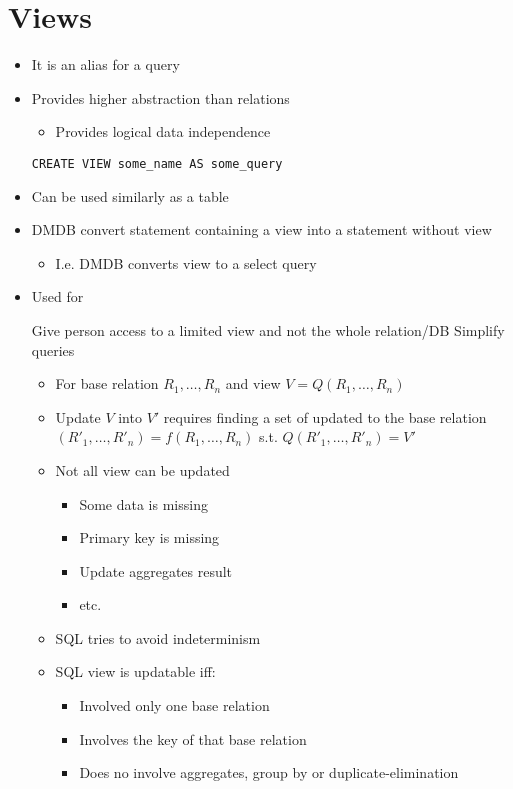 
\section{Views}
\begin{itemize}
    \item It is an alias for a query
    \item Provides higher abstraction than relations
        \begin{itemize}
            \item Provides logical data independence
        \end{itemize}
     \verb+CREATE VIEW some_name AS some_query+
    \item Can be used similarly as a table
    \item DMDB convert statement containing a view into a statement without view
        \begin{itemize}
            \item I.e. DMDB converts view to a select query
        \end{itemize}
    \item Used for
        \begin{itemize}
             Give person access to a limited view and not the whole relation/DB
             Simplify queries
        \end{itemize}
        \begin{itemize}
            \item For base relation $R_1, \dots , R_n$ and view $V = Q(R_1, \dots , R_n)$
            \item Update $V$ into $V'$ requires finding a set of updated to the base relation $(R'_1, \dots ,R'_n) = f(R_1, \dots, R_n)$ s.t. $Q(R'_1, \dots , R'_n) = V'$
            \item Not all view can be updated
                \begin{itemize}
                    \item Some data is missing
                    \item Primary key is missing
                    \item Update aggregates result
                    \item etc.
                \end{itemize}
            \item SQL tries to avoid indeterminism
            \item SQL view is updatable iff:
                \begin{itemize}
                    \item Involved only one base relation
                    \item Involves the key of that base relation
                    \item Does no involve aggregates, group by or duplicate-elimination
                \end{itemize}
        \end{itemize}
\end{itemize}

